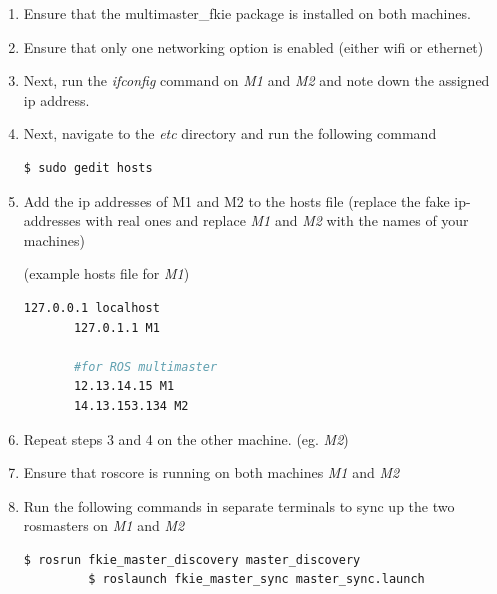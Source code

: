 \documentclass[11pt]{article}
\begin{document}
\begin{enumerate}
 \item {
       Ensure that the multimaster\_fkie package is installed on both machines.
       }
 \item {
       Ensure that only one networking option is enabled (either wifi or ethernet)
       }
 \item{
       Next, run the \emph{ifconfig} command on \emph{M1} and \emph{M2} and note down the  assigned ip address.
       }
 \item{
       Next, navigate to the \emph{etc} directory and run the following command
       \begin{lstlisting}[language=bash]
        $ sudo gedit hosts
        \end{lstlisting}
       }
 \item{
       Add the ip addresses of M1 and M2 to the hosts file (replace the fake ip-addresses with real ones and replace \emph{M1} and \emph{M2} with the names of your machines)
       
       (example hosts file for \emph{M1})
       \begin{lstlisting}[language=bash]
       127.0.0.1 localhost
       127.0.1.1 M1

       #for ROS multimaster
       12.13.14.15 M1
       14.13.153.134 M2
        \end{lstlisting}
       }
 \item{
       Repeat steps 3 and 4 on  the other machine. (eg. \emph{M2})
       }
 \item{
       Ensure that roscore is running on both machines \emph{M1} and \emph{M2}
       }
 \item{
       Run the following commands in separate terminals to sync up the two rosmasters on \emph{M1} and \emph{M2}
       \begin{lstlisting}[language=bash]
         $ rosrun fkie_master_discovery master_discovery
         $ roslaunch fkie_master_sync master_sync.launch
        \end{lstlisting}
       
       }
\end{enumerate}
\end{document}
